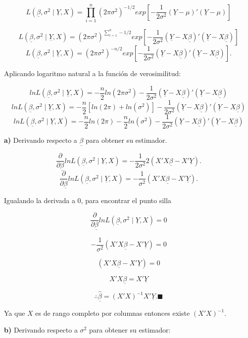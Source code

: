 \documentclass[a4paper,oneside,openany]{book}
\begin{document}
\[L(\underline{\beta},\sigma^2 \mid \underline{Y},X)=\prod_{i=1}^{n}(2\pi\sigma^2)^{-1/2} exp \left[ - \frac{1}{2\sigma^2}(\underline{Y}-\mu)'(\underline{Y}-\mu) \right]\]

\[L(\underline{\beta},\sigma^2 \mid \underline{Y},X)=(2\pi\sigma^2)^{\sum_{i=1}^{n}-1/2} exp \left[ - \frac{1}{2\sigma^2}(\underline{Y}-X\underline{\beta})'(\underline{Y}-X\underline{\beta}) \right]\]
\[L(\underline{\beta},\sigma^2 \mid \underline{Y},X)=(2\pi\sigma^2)^{-n/2} exp \left[ - \frac{1}{2\sigma^2}(\underline{Y}-X\underline{\beta})'(\underline{Y}-X\underline{\beta}) \right].\]

Aplicando logaritmo natural a la función de verosimilitud:

\[lnL(\underline{\beta},\sigma^2 \mid \underline{Y},X)= -\frac{n}{2}ln(2\pi\sigma^2)-\frac{1}{2\sigma^2}(\underline{Y}-X\underline{\beta})'(\underline{Y}-X\underline{\beta})\]
\[lnL(\underline{\beta},\sigma^2 \mid \underline{Y},X)= -\frac{n}{2}[ln(2\pi)+ln(\sigma^2)]-\frac{1}{2\sigma^2}(\underline{Y}-X\underline{\beta})'(\underline{Y}-X\underline{\beta})\]
\[lnL(\underline{\beta},\sigma^2 \mid \underline{Y},X)= -\frac{n}{2}ln(2\pi)-\frac{n}{2}ln(\sigma^2)-\frac{1}{2\sigma^2}(\underline{Y}-X\underline{\beta})'(\underline{Y}-X\underline{\beta})\]

\textbf{a)} Derivando respecto a \(\underline{\beta}\) para obtener su
estimador.

\[\frac{\partial}{\partial \underline{\beta}}lnL(\underline{\beta},\sigma^2 \mid \underline{Y},X)=-\frac{1}{2\sigma^2}2(X'X\underline{\beta}-X'\underline{Y}).\]
\[\frac{\partial}{\partial \underline{\beta}}lnL(\underline{\beta},\sigma^2 \mid \underline{Y},X)=-\frac{1}{\sigma^2}(X'X\underline{\beta}-X'\underline{Y}).\]

Igualando la derivada a 0, para encontrar el punto silla

\[\frac{\partial}{\partial \underline{\beta}}lnL(\underline{\beta},\sigma^2 \mid \underline{Y},X)=0\]

\[-\frac{1}{\sigma^2}(X'X\underline{\beta}-X'\underline{Y})=0\]

\[(X'X\underline{\beta}-X'\underline{Y})=0\]

\[X'X\underline{\beta}=X'\underline{Y}\]

\[\therefore \underline{\hat{\beta}}=(X'X)^{-1}X'\underline{Y}. \blacksquare\]

Ya que \(X\) es de rango completo por columnas entonces existe
\((X'X)^{-1}.\)

\textbf{b)} Derivando respecto a \(\sigma^2\) para obtener su estimador:
\end{document}
